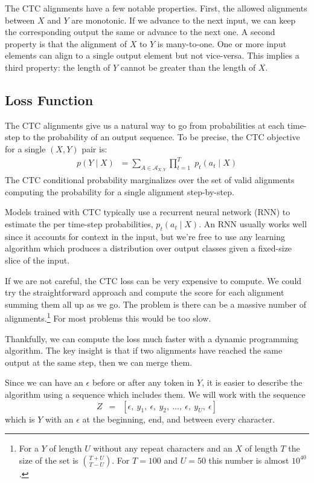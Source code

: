The CTC alignments have a few notable properties. First, the allowed alignments
between $X$ and $Y$ are monotonic.  If we advance to the next input, we can
keep the corresponding output the same or advance to the next one. A second
property is that the alignment of $X$ to $Y$ is many-to-one. One or more input
elements can align to a single output element but not vice-versa. This implies
a third property: the length of $Y$ cannot be greater than the length of $X$.

\subsection{Loss Function}

The CTC alignments give us a natural way to go from probabilities at each
time-step to the probability of an output sequence. To be precise, the CTC
objective for a single $(X, Y)$ pair is:
\begin{align*}
p(Y \mid X) \;\; = \sum_{A \in \mathcal{A}_{X,Y}}
      \prod_{t=1}^T \; p_t(a_t \mid X)
\end{align*}
The CTC conditional probability marginalizes over the set of valid alignments
computing the probability for a single alignment step-by-step.

Models trained with CTC typically use a recurrent neural network (RNN) to
estimate the per time-step probabilities, $p_t(a_t \mid X)$. An RNN usually
works well since it accounts for context in the input, but we're free to use
any learning algorithm which produces a distribution over output classes given
a fixed-size slice of the input.

If we are not careful, the CTC loss can be very expensive to compute. We could
try the straightforward approach and compute the score for each alignment
summing them all up as we go. The problem is there can be a massive number of
alignments.\footnote{For a $Y$ of length $U$ without any repeat characters and
an $X$ of length $T$ the size of the set is ${T + U \choose T - U}$. For
$T=100$ and $U=50$ this number is almost $10^{40}$.} For most problems this
would be too slow.

Thankfully, we can compute the loss much faster with a dynamic programming
algorithm. The key insight is that if two alignments have reached the same
output at the same step, then we can merge them.

Since we can have an $\epsilon$ before or after any token in $Y$, it is easier
to describe the algorithm using a sequence which includes them. We will work
with the sequence
\[
Z \enspace =\enspace [\epsilon, ~y_1, ~\epsilon, ~y_2,~ \ldots, ~\epsilon, ~y_U, ~\epsilon]
\]
which is $Y$ with an $\epsilon$ at the beginning, end, and between every
character.

